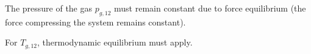 The pressure of the gas \( p_{g,12} \) must remain constant due to force equilibrium (the force compressing the system remains constant).  

For \( T_{g,12} \), thermodynamic equilibrium must apply.